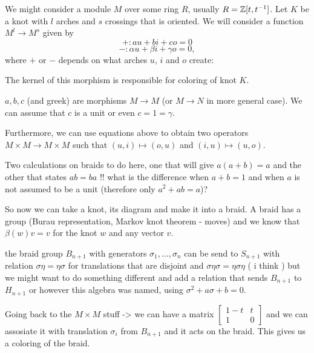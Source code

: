 {\color{blue}
We might consider a module $M$ over some ring $R$, usually $R=\operatorname{\mathbb{Z}}[t, t^{-1}]$. Let $K$ be a knot with $l$ arches and $s$ crossings that is oriented. We will consider a function $M^{l}\to M^{s}$ given by
$$+: au+bi+co = 0$$
$$-: \alpha u+\beta i + \gamma o = 0,$$
where $+$ or $-$ depends on what arches $u$, $i$ and $o$ create:
\begin{center}
\end{center}
The kernel of this morphism is responsible for coloring of knot $K$. 

$a, b, c$ (and greek) are morphisms $M\to M$ (or $M\to N$ in more general case). We can assume that $c$ is a unit or even $c=1=\gamma$.

Furthermore, we can use equations above to obtain two operators $M\times M\to M\times M$ such that $(u,i)\mapsto (o, u)$ and $(i,u)\mapsto (u, o)$.

Two calculations on braids to do here, one that will give $a(a+b)=a$ and the other that states $ab=ba$ !! what is the difference when $a+b=1$ and when $a$ is not assumed to be a unit (therefore only $a^2+ab=a$)?

So now we can take a knot, its diagram and make it into a braid. A braid has a group (Burau representation, Markov knot theorem - moves) and we know that $\beta(w)v=v$ for the knot $w$ and any vector $v$.

the braid group $B_{n+1}$ with generators $\sigma_1, ..., \sigma_n$ can be send to $S_{n+1}$ with relation $\sigma\eta=\eta\sigma$ for translations that are disjoint and $\sigma\eta\sigma=\eta\sigma\eta$ ( i think ) but we might want to do something different and add a relation that sends $B_{n+1}$ to $H_{n+1}$ or however this algebra was named, using $\sigma^2+a\sigma+b=0$.

Going back to the $M\times M$ stuff -> we can have a matrix $\begin{bmatrix} 1-t & t\\ 1 & 0\end{bmatrix}$ and we can assosiate it with translation $\sigma_i$ from $B_{n+1}$ and it acts on the braid. This gives us a coloring of the braid.
}

